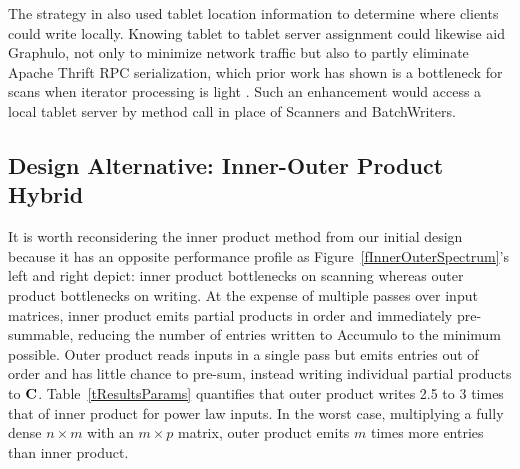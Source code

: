 The strategy in \cite{kepner2014achieving} 
also used %
tablet location information
to determine where clients could write locally.
Knowing tablet to tablet server assignment could likewise aid Graphulo, 
not only to minimize network traffic
but also
 to partly eliminate Apache Thrift RPC serialization,
which prior work has shown is a bottleneck for scans %
when iterator processing is light \cite{sawyer2013understanding}.
Such an enhancement would access a local tablet server by method call 
in place of Scanners and BatchWriters.


\subsection{Design Alternative: Inner-Outer Product Hybrid}

It is worth reconsidering the inner product method from our initial design
because it has an opposite performance profile as 
Figure~\ref{fInnerOuterSpectrum}'s left and right depict: 
inner product bottlenecks on scanning whereas outer product bottlenecks on writing.
At the expense of multiple passes over input matrices, inner product emits 
partial products in order and immediately pre-summable,
reducing the number of entries written to Accumulo to the minimum possible.
Outer product reads inputs in a single pass
but emits entries out of order and has little chance to pre-sum, 
instead writing individual partial products to $\mathbf{C}$.
Table~\ref{tResultsParams} quantifies that outer product writes
2.5 to 3 times that of inner product for power law inputs.
In the worst case, multiplying a fully dense $n \times m$ with an $m \times p$ matrix,
outer product emits $m$ times more entries than inner product.



